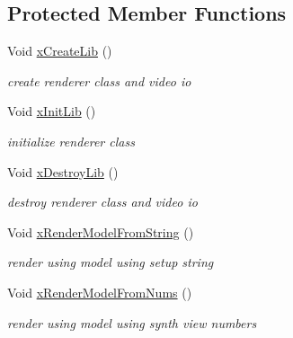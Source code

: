 \subsection*{Protected Member Functions}
\begin{DoxyCompactItemize}
\item 
\mbox{\label{class_t_app_renderer_top_a504e03b9658afd32b167f0424c8ec261}} 
Void \hyperlink{class_t_app_renderer_top_a504e03b9658afd32b167f0424c8ec261}{x\+Create\+Lib} ()
\begin{DoxyCompactList}\small\item\em create renderer class and video io \end{DoxyCompactList}\item 
\mbox{\label{class_t_app_renderer_top_ab6e3b98d95b13973aa326f54b2df6ac3}} 
Void \hyperlink{class_t_app_renderer_top_ab6e3b98d95b13973aa326f54b2df6ac3}{x\+Init\+Lib} ()
\begin{DoxyCompactList}\small\item\em initialize renderer class \end{DoxyCompactList}\item 
\mbox{\label{class_t_app_renderer_top_a4d6f12fc25a511ccb7b2bad85baca31f}} 
Void \hyperlink{class_t_app_renderer_top_a4d6f12fc25a511ccb7b2bad85baca31f}{x\+Destroy\+Lib} ()
\begin{DoxyCompactList}\small\item\em destroy renderer class and video io \end{DoxyCompactList}\item 
\mbox{\label{class_t_app_renderer_top_a9cc2d36239e577ea4ea4828423c125a9}} 
Void \hyperlink{class_t_app_renderer_top_a9cc2d36239e577ea4ea4828423c125a9}{x\+Render\+Model\+From\+String} ()
\begin{DoxyCompactList}\small\item\em render using model using setup string \end{DoxyCompactList}\item 
Void \hyperlink{class_t_app_renderer_top_ac1d924fe9ae49d24ab3dab1cedc99a8a}{x\+Render\+Model\+From\+Nums} ()
\begin{DoxyCompactList}\small\item\em render using model using synth view numbers \end{DoxyCompactList}\end{DoxyCompactItemize}

